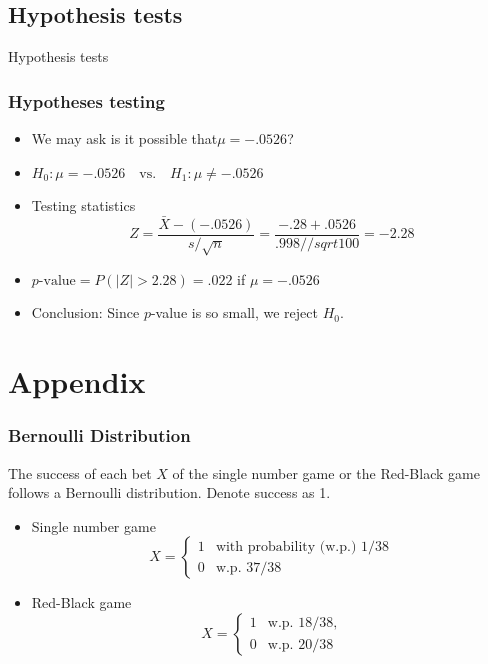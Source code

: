 \documentclass[
  ignorenonframetext,
]{beamer}
\begin{document}
\begin{frame}
\end{frame}

\hypertarget{hypothesis-tests}{%
\subsection{Hypothesis tests}\label{hypothesis-tests}}

\begin{frame}{Hypothesis tests}
\frametitle{Hypotheses testing}

\begin{itemize}
\item
  We may ask is it possible that\(\mu=-.0526\)?
\item
  \(H_0: \mu = -.0526 \quad \mbox{vs.} \quad H_1: \mu \neq -.0526\)
\item
  Testing statistics \[
  Z = \frac{\bar{X} - (-.0526)}{s/\sqrt{n}} = \frac{-.28 + .0526}{.998/{/sqrt{100}}} = -2.28
  \]
\item
  \(p\mbox{-value}=P(|Z|> 2.28) =.022\) if \(\mu = -.0526\)
\item
  Conclusion: Since \(p\)-value is so small, we reject \(H_0\).
\end{itemize}
\end{frame}

\hypertarget{appendix}{%
\section{Appendix}\label{appendix}}

\begin{frame}
\frametitle{Bernoulli Distribution}

The success of each bet \(X\) of the single number game or the Red-Black
game follows a Bernoulli distribution. Denote success as 1.

\begin{itemize}
\item
  Single number game
  \[X = \begin{cases} 1 & \text{with probability (w.p.) 1/38} \\
                    0 & \text{w.p. 37/38} \end{cases}\]
\item
  Red-Black game \[X = \begin{cases} 1 & \text{w.p. 18/38,} \\
                    0 & \text{w.p. 20/38} \end{cases}\]
\end{itemize}
\end{frame}
\end{document}
